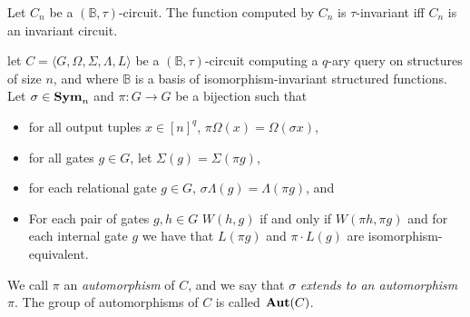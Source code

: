 \documentclass[../paper.tex]{subfiles}
\begin{document}
\begin{lem}
  Let $C_n$ be a $(\mathbb{B}, \tau)$-circuit. The function computed by $C_n$ is
  $\tau$-invariant iff $C_n$ is an invariant circuit.
\end{lem}


\begin{definition}[Automorphism]
  let $C = \langle G, \Omega, \Sigma, \Lambda, L\rangle$ be a
  $(\mathbb{B},\tau)$-circuit computing a $q$-ary query on structures of size
  $n$, and where $\mathbb{B}$ is a basis of isomorphism-invariant structured
  functions. Let $\sigma \in \text{\textbf{Sym}}_n$ and $\pi: G \rightarrow G$ be a bijection
  such that
  \begin{itemize}
    \setlength\itemsep{0mm}
  \item for all output tuples $x \in [n]^q$, $\pi \Omega (x) = \Omega (\sigma
    x)$,
  \item for all gates $g \in G$, let $\Sigma (g) = \Sigma (\pi g)$,
  \item for each relational gate $g \in G$, $\sigma \Lambda (g) = \Lambda (\pi
    g)$, and
  \item For each pair of gates $g, h \in G$ $W(h,g)$ if and only if $W(\pi h,
    \pi g)$ and for each internal gate $g$ we have that $L(\pi g)$ and $ \pi
    \cdot L(g)$ are isomorphism-equivalent.
  \end{itemize}
  We call $\pi$ an \emph{automorphism} of $C$, and we say that $\sigma$
  \emph{extends to an automorphism} $\pi$. The group of automorphisms of $C$ is
  called $\text{\textbf{Aut}} (C)$.
\end{definition}
\end{document}
